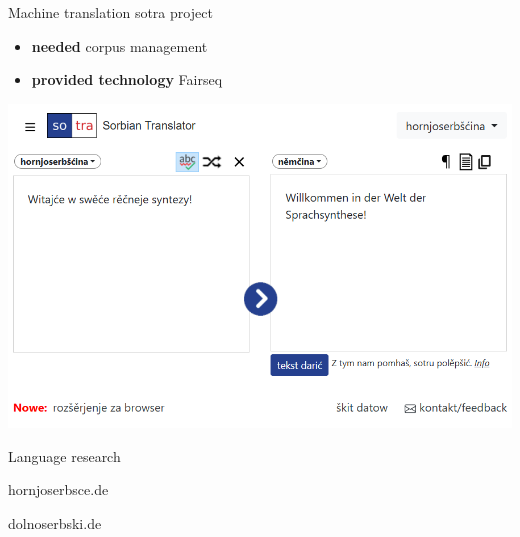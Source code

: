 \documentclass[final]{beamer}
\newlength{\colwidth}
\begin{document}
\begin{frame}[t]
\begin{columns}[t]
\begin{column}{\colwidth}
\begin{block}{Machine translation}
    sotra project

    \begin{itemize}
      \item \textbf{needed} corpus management
      \item \textbf{provided technology} Fairseq
    \end{itemize}

    \includegraphics[width=\colwidth]{sotra.png}

  \end{block}

  \begin{block}{Language research}  
  

    hornjoserbsce.de

    dolnoserbski.de


\end{block}
\end{column}
\end{columns}
\end{frame}
\end{document}
